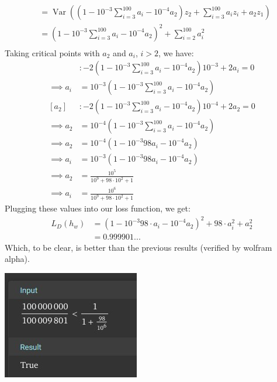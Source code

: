 \documentclass{amsart}
\DeclareMathOperator{\Var}{Var}  %
\theoremstyle{definition}
\begin{document}
\begin{enumerate}[(a)]
\begin{enumerate}[i.]
\begin{align*}
          &= \Var\left(\left(1 - 10^{-3}\sum_{i = 3}^{100} a_i - 10^{-4} a_2\right)z_2 + \sum_{i = 3}^{100} a_i z_i + a_2 z_1\right)\\
          &= \left(1 - 10^{-3}\sum_{i = 3}^{100} a_i - 10^{-4} a_2\right)^2 + \sum_{i = 2}^{100} a_i^2\\
        \end{align*}
        Taking critical points with $a_2$ and $a_i$, $i > 2$, we have:
        \begin{align*}
          [a_i]&: -2 \left(1 - 10^{-3}\sum_{i = 3}^{100} a_i - 10^{-4} a_2\right) 10^{-3} + 2 a_i = 0\\
          \implies a_i &= 10^{-3} \left(1 - 10^{-3}\sum_{i = 3}^{100} a_i - 10^{-4} a_2\right)\\
          [a_2]&: -2 \left(1 - 10^{-3}\sum_{i = 3}^{100} a_i - 10^{-4} a_2\right) 10^{-4} + 2 a_2 = 0\\
          \implies a_2 &= 10^{-4} \left(1 - 10^{-3}\sum_{i = 3}^{100} a_i - 10^{-4} a_2\right)\\
          \implies a_2 &= 10^{-4}\left(1- 10^{-3}98 a_i - 10^{-4} a_2\right)\\
          \implies a_i &= 10^{-3}\left(1 - 10^{-3}98 a_i - 10^{-4} a_2\right)\\
          \implies a_2 &= \frac{10^5}{10^9 + 98 \cdot 10^2 + 1}\\
          \implies a_i &= \frac{10^6}{10^9 + 98 \cdot 10^2 + 1}
        \end{align*}
        Plugging these values into our loss function, we get:
        \begin{align*}
          L_D(h_w)&= \left(1 - 10^{-3}98\cdot a_i - 10^{-4} a_2\right)^2 + 98 \cdot a_i^2 + a_2^2\\
          &= 0.999901... 
        \end{align*}
        Which, to be clear, is better than the previous results (verified by wolfram alpha).

        \includegraphics{Screenshot 2025-02-25 215956.jpg}


\end{enumerate}
\end{enumerate}
\end{document}
